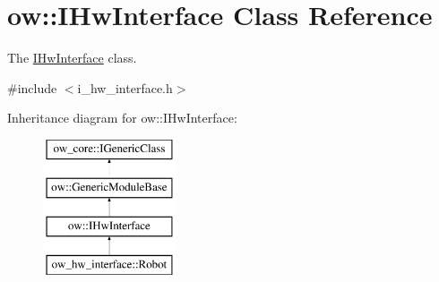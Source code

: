 \hypertarget{classow_1_1IHwInterface}{}\section{ow\+:\+:I\+Hw\+Interface Class Reference}
\label{classow_1_1IHwInterface}


The \hyperlink{classow_1_1IHwInterface}{I\+Hw\+Interface} class.  




{\ttfamily \#include $<$i\+\_\+hw\+\_\+interface.\+h$>$}

Inheritance diagram for ow\+:\+:I\+Hw\+Interface\+:\begin{figure}[H]
\begin{center}
\leavevmode
\includegraphics[height=4.000000cm]{d0/dda/classow_1_1IHwInterface}
\end{center}
\end{figure}
